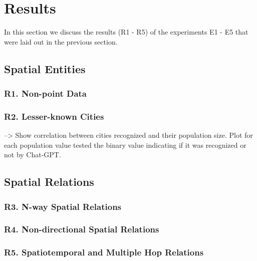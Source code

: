 \section{Results}
\label{section:results}

In this section we discuss the results (R1 - R5) of the experiments E1 - E5 that were laid out in the previous section.

\subsection{Spatial Entities} %

\subsubsection{R1. Non-point Data}


\subsubsection{R2. Lesser-known Cities}
--> Show correlation between cities recognized and their population size. Plot for each population value tested the binary value indicating if it was recognized or not by Chat-GPT.



\subsection{Spatial Relations} %

\subsubsection{R3. N-way Spatial Relations}


\subsubsection{R4. Non-directional Spatial Relations}


\subsubsection{R5. Spatiotemporal and Multiple Hop Relations}
